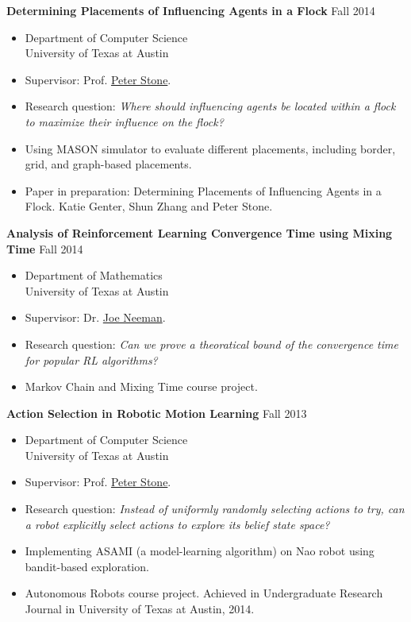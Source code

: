 \documentclass[10pt]{article}
\newenvironment{innerlist}[1][\enskip\textbullet]%
        {\begin{itemize}[#1,leftmargin=*,parsep=0pt,itemsep=0pt,topsep=0pt,partopsep=0pt]}
        {\end{itemize}}
\begin{document}
\textbf{Determining Placements of Influencing Agents in a Flock} \hfill {Fall 2014}
\begin{innerlist}
\item[] Department of Computer Science\\
        University of Texas at Austin
\vspace{.05in}
\item Supervisor: Prof. \href{http://www.cs.utexas.edu/~pstone/}{Peter Stone}.
\item Research question: {\em Where should influencing agents be located within
a flock to maximize their influence on the flock?}
\item Using MASON simulator to evaluate different placements, including border,
grid, and graph-based placements.
\item Paper in preparation: Determining Placements of Influencing Agents in a
Flock. Katie Genter, Shun Zhang and Peter Stone.
\end{innerlist}
\vspace{.1in}

\textbf{Analysis of Reinforcement Learning Convergence Time using Mixing Time} \hfill {Fall 2014}
\begin{innerlist}
\item[] Department of Mathematics\\
        University of Texas at Austin
\vspace{.05in}
\item Supervisor: Dr. \href{http://joeneeman.com}{Joe Neeman}.
\item Research question: {\em Can we prove a theoratical bound of the
convergence time for popular RL algorithms?}
\item Markov Chain and Mixing Time course project.
\end{innerlist}
\vspace{.1in}

\textbf{Action Selection in Robotic Motion Learning} \hfill {Fall 2013}
\begin{innerlist}
\item[] Department of Computer Science\\
        University of Texas at Austin
\vspace{.05in}
\item Supervisor: Prof. \href{http://www.cs.utexas.edu/~pstone/}{Peter Stone}.
\item Research question: {\em Instead of uniformly randomly selecting actions to
try, can a robot explicitly select actions to explore its belief state space?}
\item Implementing ASAMI (a model-learning algorithm) on Nao robot using
bandit-based exploration.
\item Autonomous Robots course project. Achieved in Undergraduate Research
Journal in University of Texas at Austin, 2014.
\end{innerlist}
\vspace{.1in}
\end{document}
